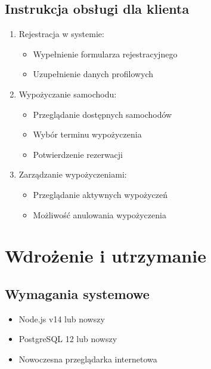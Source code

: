 \documentclass[12pt]{article}
\begin{document}
\subsection{Instrukcja obsługi dla klienta}
\begin{enumerate}
    \item Rejestracja w systemie:
    \begin{itemize}
        \item Wypełnienie formularza rejestracyjnego
        \item Uzupełnienie danych profilowych
    \end{itemize}

    \item Wypożyczanie samochodu:
    \begin{itemize}
        \item Przeglądanie dostępnych samochodów
        \item Wybór terminu wypożyczenia
        \item Potwierdzenie rezerwacji
    \end{itemize}

    \item Zarządzanie wypożyczeniami:
    \begin{itemize}
        \item Przeglądanie aktywnych wypożyczeń
        \item Możliwość anulowania wypożyczenia
    \end{itemize}
\end{enumerate}

\section{Wdrożenie i utrzymanie}

\subsection{Wymagania systemowe}
\begin{itemize}
    \item Node.js v14 lub nowszy
    \item PostgreSQL 12 lub nowszy
    \item Nowoczesna przeglądarka internetowa
\end{itemize}
\end{document}
